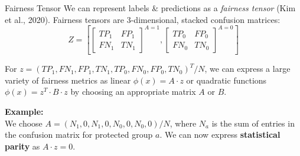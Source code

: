 \documentclass[11pt,compress,t,notes=noshow, xcolor=table]{beamer}
\begin{document}
\begin{vbframe}{Fairness Tensor}
    We can represent labels \& predictions as a \emph{fairness tensor} (Kim et al., 2020). Fairness tensors are 3-dimensional, stacked confusion matrices:
    $$Z = \left[
    \begin{bmatrix}
    TP_1  & FP_1 \\
    FN_1  & TN_1
    \end{bmatrix} ^{A=1}
    ,
    \begin{bmatrix}
      TP_0  & FP_0 \\
      FN_0  & TN_0
    \end{bmatrix} ^{A=0} 
    \right]$$
    \vspace{.2cm}

    For $z = (TP_1,FN_1,FP_1,TN_1,TP_0,FN_0,FP_0,TN_0)^T / N$, we can express a large variety of fairness metrics as linear $\phi(x) = A \cdot z$ or quadratic functions $\phi(x) = z^T \cdot B \cdot z$ by choosing an appropriate matrix $A$ or $B$. \\
    \vspace{15pt}
    
    \textbf{Example:} \\ We choose $A = (N_1, 0, N_1, 0, N_0, 0, N_0, 0) / N$, where $N_{a}$ is the sum of entries in the confusion matrix for protected group $a$.
    We can now express \textbf{statistical parity} as $A \cdot z = 0$.
\end{vbframe}
\end{document}
